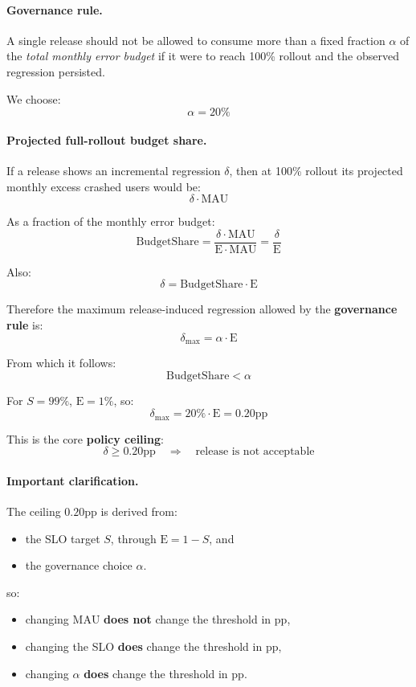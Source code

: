 \documentclass{article}
\newcommand{\MAU}{\mathrm{MAU}}
\newcommand{\E}{\mathrm{E}}
\newcommand{\pp}{\text{pp}}
\begin{document}
\paragraph{Governance rule.}
A single release should not be allowed to consume more than a fixed fraction $\alpha$ of the \emph{total monthly error budget} if it were to reach 100\% rollout and the observed regression persisted.

We choose:
\[
\alpha = 20\%
\]

\paragraph{Projected full-rollout budget share.}
If a release shows an incremental regression $\delta$, then at 100\% rollout its projected monthly excess crashed users would be:
\[
\delta \cdot \MAU
\]

As a fraction of the monthly error budget: 
\[
\text{BudgetShare}
=
\frac{\delta \cdot \MAU}{\E \cdot \MAU}
=
\frac{\delta}{\E}
\]

Also:
\[
\delta = \text{BudgetShare} \cdot \E
\]

Therefore the maximum release-induced regression allowed by the \textbf{governance rule} is:
\[
\delta_{\max} = \alpha \cdot \E
\]

From which it follows:
\[
\text{BudgetShare} < \alpha
\]

For $S = 99\%$, $\E = 1\%$, so:
\[
\delta_{\max} = 20\% \cdot \E = 0.20\pp
\]

This is the core \textbf{policy ceiling}:
\[
\delta \ge 0.20\pp \quad \Rightarrow \quad \text{release is not acceptable}
\]

\paragraph{Important clarification.}
The ceiling $0.20\pp$ is derived from:
\begin{itemize}[leftmargin=1.4em]
    \item the SLO target $S$, through $\E = 1 - S$, and
    \item the governance choice $\alpha$.
\end{itemize}

so:

\begin{itemize}[leftmargin=1.4em]
    \item changing $\MAU$ \textbf{does not} change the threshold in $\pp$,
    \item changing the SLO \textbf{does} change the threshold in $\pp$,
    \item changing $\alpha$ \textbf{does} change the threshold in $\pp$.
\end{itemize}
\end{document}
